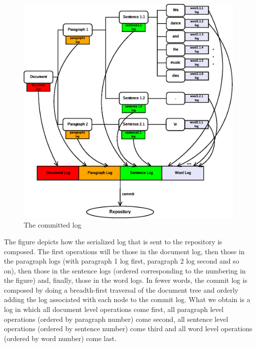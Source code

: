 \begin{figure}[!p]
\begin{center}
\includegraphics{img/commit.eps}
\end{center}
\caption{The committed log}
\label{fig:clog}
\end{figure}

The figure depicts how the serialized log that is sent to the repository is composed. The first
operations will be those in the document log, then those in the paragraph logs (with paragraph
1 log first, paragraph 2 log second and so on), then those in the sentence logs (ordered
corresponding to the numbering in the figure) and, finally, those in the word logs. In fewer
words, the commit log is composed by doing a breadth-first traversal of the document tree
and orderly adding the log associated with each node to the commit log. What we obtain is
a log in which all document level operations come first, all paragraph level operations
(ordered by paragraph number) come second, all sentence level operations (ordered by
sentence number) come third and all word level operations (ordered by word number) come
last.

